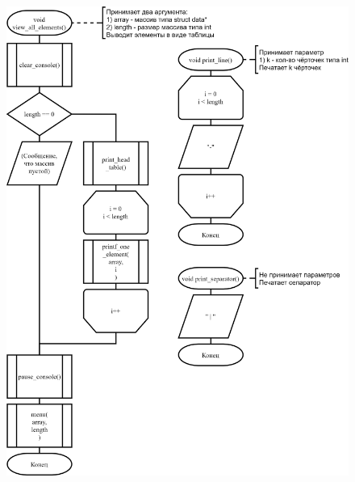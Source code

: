 \begin{figure}[!htp]
    \includegraphics{../../Makefile-project/src/menu/view_all_elements/view_all_elements-1.png}
\end{figure}

